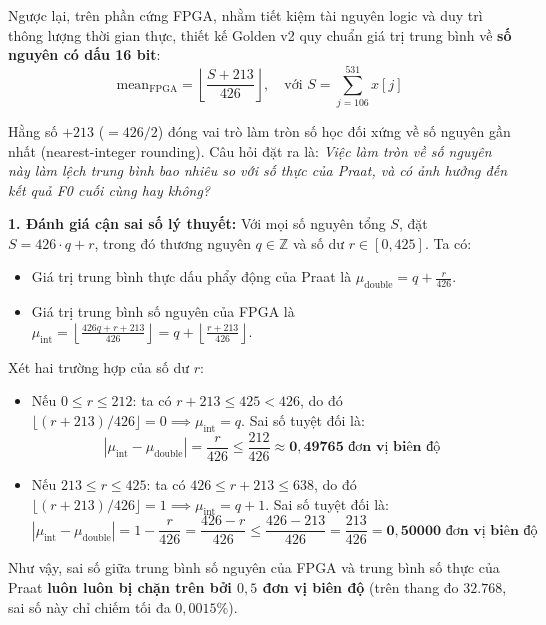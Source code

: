 Ngược lại, trên phần cứng FPGA, nhằm tiết kiệm tài nguyên logic và duy trì thông lượng thời gian thực, thiết kế Golden v2 quy chuẩn giá trị trung bình về \textbf{số nguyên có dấu 16 bit}:
\begin{equation}
\text{mean}_{\text{FPGA}} = \left\lfloor \frac{S + 213}{426} \right\rfloor, \quad \text{với } S = \sum_{j=106}^{531} x[j]
\end{equation}

Hằng số $+213$ ($= 426/2$) đóng vai trò làm tròn số học đối xứng về số nguyên gần nhất (nearest-integer rounding). Câu hỏi đặt ra là: \emph{Việc làm tròn về số nguyên này làm lệch trung bình bao nhiêu so với số thực của Praat, và có ảnh hưởng đến kết quả F0 cuối cùng hay không?}

\textbf{1. Đánh giá cận sai số lý thuyết:}
Với mọi số nguyên tổng $S$, đặt $S = 426 \cdot q + r$, trong đó thương nguyên $q \in \mathbb{Z}$ và số dư $r \in [0, 425]$. Ta có:
\begin{itemize}[leftmargin=1.5em, itemsep=2pt]
    \item Giá trị trung bình thực dấu phẩy động của Praat là $\mu_{\text{double}} = q + \frac{r}{426}$.
    \item Giá trị trung bình số nguyên của FPGA là $\mu_{\text{int}} = \left\lfloor \frac{426q + r + 213}{426} \right\rfloor = q + \left\lfloor \frac{r + 213}{426} \right\rfloor$.
\end{itemize}
Xét hai trường hợp của số dư $r$:
\begin{itemize}[leftmargin=1.5em, itemsep=2pt]
    \item Nếu $0 \le r \le 212$: ta có $r + 213 \le 425 < 426$, do đó $\lfloor (r+213)/426 \rfloor = 0 \implies \mu_{\text{int}} = q$. Sai số tuyệt đối là:
    \begin{equation}
    |\mu_{\text{int}} - \mu_{\text{double}}| = \frac{r}{426} \le \frac{212}{426} \approx \mathbf{0{,}49765\text{ đơn vị biên độ}}
    \end{equation}
    \item Nếu $213 \le r \le 425$: ta có $426 \le r + 213 \le 638$, do đó $\lfloor (r+213)/426 \rfloor = 1 \implies \mu_{\text{int}} = q + 1$. Sai số tuyệt đối là:
    \begin{equation}
    |\mu_{\text{int}} - \mu_{\text{double}}| = 1 - \frac{r}{426} = \frac{426 - r}{426} \le \frac{426 - 213}{426} = \frac{213}{426} = \mathbf{0{,}50000\text{ đơn vị biên độ}}
    \end{equation}
\end{itemize}
Như vậy, sai số giữa trung bình số nguyên của FPGA và trung bình số thực của Praat \textbf{luôn luôn bị chặn trên bởi $0{,}5$ đơn vị biên độ} (trên thang đo $32.768$, sai số này chỉ chiếm tối đa $0{,}0015\%$).

